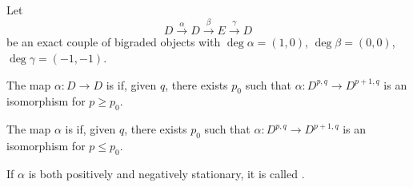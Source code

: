 Let
\[
D \xrightarrow{\alpha} D \xrightarrow{\beta} E \xrightarrow{\gamma} D
\]
be an exact couple of bigraded objects with $\deg \alpha = (1,0)$, $\deg \beta = (0,0)$, $\deg \gamma = (-1,-1)$.

The map $\alpha : D \to D$ is  if, given $q$, there exists $p_0$ such that $\alpha : D^{p,q} \to D^{p+1,q}$ is an isomorphism for $p \geq p_0$.

The map $\alpha$ is  if, given $q$, there exists $p_0$ such that $\alpha : D^{p,q} \to D^{p+1,q}$ is an isomorphism for $p \leq p_0$.

If $\alpha$ is both positively and negatively stationary, it is called .
